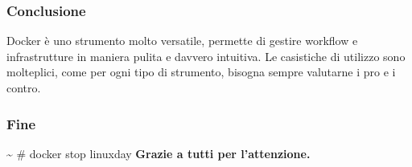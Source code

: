 \documentclass{beamer}
\begin{document}

\begin{frame}
    \frametitle{VM vs Docker: layers}
    \begin{center}
        \texttt{[image: \{vmvsdocker.png]}}
    \end{center}
\end{frame}


\begin{frame}
    \frametitle{Conclusione}
    Docker \`e uno strumento molto versatile, permette di gestire workflow e infrastrutture in maniera pulita e davvero intuitiva. Le casistiche di utilizzo
    sono molteplici, come per ogni tipo di strumento, bisogna sempre valutarne i pro e i contro.
\end{frame}


\begin{frame}
    \frametitle{Fine}
    \begin{center}
        \~{} \#{} docker stop linuxday 
        \newline
        \newline
        \textbf{Grazie a tutti per l'attenzione.}
    \end{center}
\end{frame}

\end{document}
